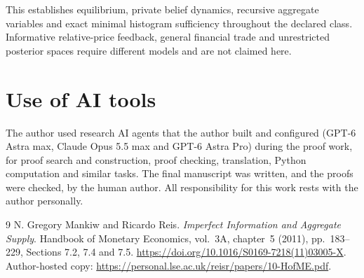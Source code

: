 \documentclass[11pt]{article}
\begin{document}
This establishes equilibrium, private belief dynamics, recursive aggregate variables and exact minimal histogram sufficiency throughout the declared class. Informative relative-price feedback, general financial trade and unrestricted posterior spaces require different models and are not claimed here.

\section*{Use of AI tools}
The author used research AI agents that the author built and configured (GPT-6 Astra max,
Claude Opus 5.5 max and GPT-6 Astra Pro) during the proof work, for proof search and
construction, proof checking, translation, Python computation and similar tasks. The final
manuscript was written, and the proofs were checked, by the human author. All responsibility
for this work rests with the author personally.

\begin{thebibliography}{9}
 N. Gregory Mankiw and Ricardo Reis.
\emph{Imperfect Information and Aggregate Supply}.
Handbook of Monetary Economics, vol.~3A, chapter~5 (2011), pp.~183--229,
Sections 7.2, 7.4 and 7.5.
\url{https://doi.org/10.1016/S0169-7218(11)03005-X}.
Author-hosted copy: \url{https://personal.lse.ac.uk/reisr/papers/10-HofME.pdf}.
\end{thebibliography}
\end{document}
